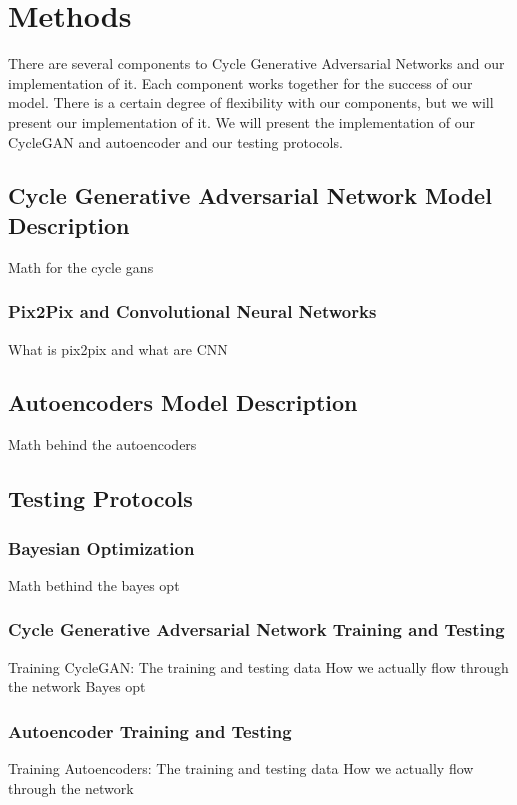 \documentclass[conference]{IEEEtran}
\begin{document}
\section{Methods}

There are several components to Cycle Generative Adversarial Networks and our implementation of it. Each component works together for the success of our model. There is a certain degree of flexibility with our components, but we will present our implementation of it. We will present the implementation of our CycleGAN and autoencoder and our testing protocols. 

\subsection{Cycle Generative Adversarial Network Model Description}
Math for the cycle gans

\subsubsection{Pix2Pix and Convolutional Neural Networks}
What is pix2pix and what are CNN

\subsection{Autoencoders Model Description}
Math behind the autoencoders 

\subsection{Testing Protocols}

\subsubsection{Bayesian Optimization}
Math bethind the bayes opt

\subsubsection{Cycle Generative Adversarial Network Training and Testing}
Training CycleGAN: 
    The training and testing data
    How we actually flow through the network 
    Bayes opt
    
\subsubsection{Autoencoder Training and Testing}
Training Autoencoders:
    The training and testing data
    How we actually flow through the network
\end{document}
